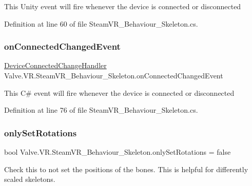 This Unity event will fire whenever the device is connected or disconnected 



Definition at line 60 of file Steam\+V\+R\+\_\+\+Behaviour\+\_\+\+Skeleton.\+cs.

\mbox{\label{class_valve_1_1_v_r_1_1_steam_v_r___behaviour___skeleton_a3ea97595c81c84bc29a6b4865b3aba23}} 
\subsubsection{\texorpdfstring{onConnectedChangedEvent}{onConnectedChangedEvent}}
{\footnotesize\ttfamily \mbox{\hyperlink{class_valve_1_1_v_r_1_1_steam_v_r___behaviour___skeleton_aa05646483bd740b42ea2455f964f9cf7}{Device\+Connected\+Change\+Handler}} Valve.\+V\+R.\+Steam\+V\+R\+\_\+\+Behaviour\+\_\+\+Skeleton.\+on\+Connected\+Changed\+Event}



This C\# event will fire whenever the device is connected or disconnected 



Definition at line 76 of file Steam\+V\+R\+\_\+\+Behaviour\+\_\+\+Skeleton.\+cs.

\mbox{\label{class_valve_1_1_v_r_1_1_steam_v_r___behaviour___skeleton_a10038fecd6aac182080f18b339226583}} 
\subsubsection{\texorpdfstring{onlySetRotations}{onlySetRotations}}
{\footnotesize\ttfamily bool Valve.\+V\+R.\+Steam\+V\+R\+\_\+\+Behaviour\+\_\+\+Skeleton.\+only\+Set\+Rotations = false}



Check this to not set the positions of the bones. This is helpful for differently scaled skeletons. 



